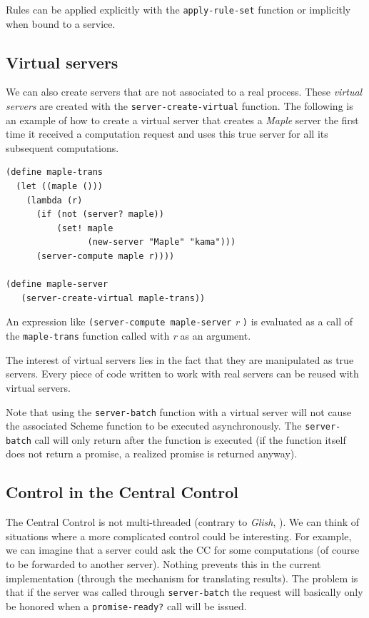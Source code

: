 \documentclass {article}
\begin{document}
Rules can be applied explicitly with the \verb+apply-rule-set+ function or
implicitly when bound to a service.


\subsection{ Virtual servers }

We can also create servers that are not associated to a real process. These 
{\sl virtual servers} are created with the {\tt server-create-virtual}
function. The following is an example of how to create a virtual server that
creates a {\sl Maple} server the first time it received a computation request
and uses this true server for all its subsequent computations.
\begin{verbatim} 
(define maple-trans
  (let ((maple ()))
    (lambda (r)
      (if (not (server? maple)) 
          (set! maple
                (new-server "Maple" "kama")))
      (server-compute maple r))))

(define maple-server 
   (server-create-virtual maple-trans))
\end{verbatim} 
An expression like {\tt (server-compute maple-server} {\em r} {\tt )} is
evaluated as a call of the {\tt maple-trans} function called with {\em r}
as an argument.

The interest of virtual servers lies in the fact that they are manipulated as
true servers. Every piece of code written to work with real servers can be
reused with virtual servers.

Note that using the {\tt server-batch} function with a virtual server will
not cause the associated Scheme function to be executed asynchronously. The 
{\tt server-batch} call will only return after the function is executed (if
the function itself does not return a promise, a realized promise is returned
anyway). 

\subsection{ Control in the Central Control }

The Central Control is not multi-threaded (contrary to {\sl Glish},
\cite{kn:GLISH}). 
We can think of situations where a more complicated control could be
interesting. 
For example, we can imagine that a server could ask the CC for
some computations (of course to be forwarded  to another server). Nothing
prevents this in the current implementation (through the mechanism for
translating results). The problem is that if the server was called through 
{\tt server-batch} the request will basically only be honored when a 
{\tt promise-ready?} call will be issued. 
\end{document}
